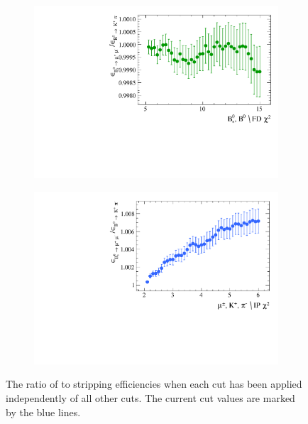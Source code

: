 \begin{figure}[htbp]
    \begin{subfigure}[b]{0.4\textwidth}
        \includegraphics[width=\textwidth]{./Figs/Selection/Bs2MuMu_KPi_FD.pdf}
    \end{subfigure}
   \begin{subfigure}[b]{0.4\textwidth}
        \includegraphics[width=\textwidth]{./Figs/Selection/Bs2MuMu_KPi_daughter_IP.pdf}
    \end{subfigure}
    \caption{The ratio of \bsmumu to \bdkpi stripping efficiencies when each cut has been applied independently of all other cuts. The current cut values are marked by the blue lines.}
    \label{fig:ratio_plotsBd2KPi}
\end{figure}


